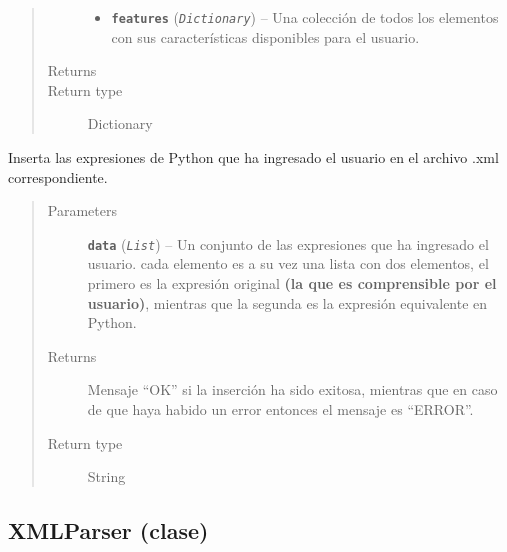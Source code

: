 \documentclass[letterpaper,10pt,english]{sphinxmanual}
\begin{document}
\begin{fulllineitems}
\begin{fulllineitems}
\begin{quote}
\begin{description}
\begin{itemize}
\item {} 
\textbf{\texttt{features}} (\emph{\texttt{Dictionary}}) -- Una colección de todos los elementos con sus características
disponibles para el usuario.

\end{itemize}

\item[{Returns}] \leavevmode


\item[{Return type}] \leavevmode
Dictionary

\end{description}\end{quote}

\end{fulllineitems}


\begin{fulllineitems}
\label{Controller/ControllerClass:Controller.Controller.Controller.save_python_expressions}
Inserta las expresiones de Python que ha ingresado
el usuario en el archivo .xml correspondiente.
\begin{quote}\begin{description}
\item[{Parameters}] \leavevmode
\textbf{\texttt{data}} (\emph{\texttt{List}}) -- Un conjunto de las expresiones que ha ingresado el usuario.
cada elemento es a su vez una lista con dos elementos, el primero
es la expresión original \textbf{(la que es comprensible por el 
usuario)}, mientras que la segunda es la expresión equivalente
en Python.

\item[{Returns}] \leavevmode
Mensaje ``OK'' si la inserción ha sido exitosa, mientras que en caso
de que haya habido un error entonces el mensaje es ``ERROR''.

\item[{Return type}] \leavevmode
String

\end{description}\end{quote}

\end{fulllineitems}


\end{fulllineitems}



\subsection{XMLParser (clase)}
\label{Controller/XMLParser:xmlparser-clase}\label{Controller/XMLParser:module-Controller.XMLParser}\label{Controller/XMLParser::doc}
\end{document}

